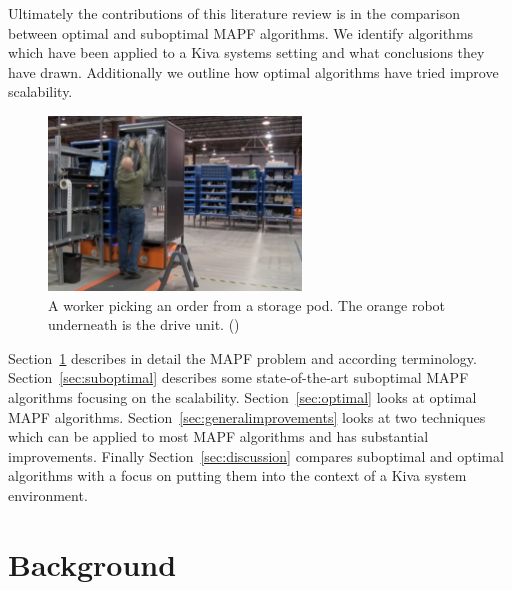 \documentclass[a4paper,11pt]{article}
\begin{document}
Ultimately the contributions of this literature review is in the comparison between optimal and suboptimal MAPF algorithms. We identify algorithms which have been applied to a Kiva systems setting and what conclusions they have drawn. Additionally we outline how optimal algorithms have tried improve scalability.

\begin{figure}[h!]
	\centering
	\includegraphics[width=0.6\textwidth ]{graphics/kivaprocess}
	\caption{A worker picking an order from a storage pod. The orange robot underneath is the drive unit. (\cite{kivayoutube2010quietlogistics})}
	\label{fig:kivaprocess}
\end{figure}

Section~\ref{sec:background} describes in detail the MAPF problem and according terminology. Section~\ref{sec:suboptimal} describes some state-of-the-art suboptimal MAPF algorithms focusing on the scalability. Section~\ref{sec:optimal} looks at optimal MAPF algorithms. Section~\ref{sec:generalimprovements} looks at two techniques which can be applied to most MAPF algorithms and has substantial improvements. Finally Section~\ref{sec:discussion} compares suboptimal and optimal algorithms with a focus on putting them into the context of a Kiva system environment.


\section{Background} \label{sec:background}
\end{document}
